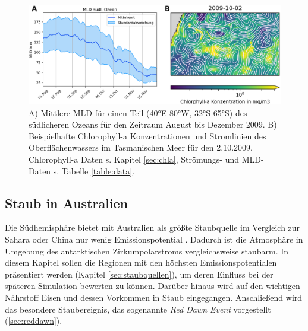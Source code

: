 \documentclass[12pt,a4paper,onecolumn]{scrartcl}
\begin{document}
\begin{figure}[!htb]
\includegraphics[width=\textwidth]{bilder/mld_currents.png}
\caption{A) Mittlere MLD für einen Teil (40°E-80°W, 32°S-65°S) des südlicheren Ozeans für den Zeitraum August bis Dezember 2009. B) Beispielhafte Chlorophyll-a Konzentrationen und Stromlinien des Oberflächenwassers im Tasmanischen Meer für den 2.10.2009. Chlorophyll-a Daten s. Kapitel \ref{sec:chla}, Strömungs- und MLD-Daten s. Tabelle \ref{table:data}.} \label{fig:mld_currents}
\end{figure}
\subsection{Staub in Australien} \label{sec:Staub}
Die Südhemisphäre bietet mit Australien als größte Staubquelle im Vergleich zur Sahara oder China nur wenig Emissionspotential \citep{Shao.2011}. Dadurch ist die Atmosphäre in Umgebung des antarktischen Zirkumpolarstroms vergleichsweise staubarm. In diesem Kapitel sollen die Regionen mit den höchsten Emissionspotentialen präsentiert werden (Kapitel \ref{sec:staubquellen}), um deren Einfluss bei der späteren Simulation bewerten zu können. Darüber hinaus wird auf den wichtigen Nährstoff Eisen und dessen Vorkommen in Staub eingegangen. Anschließend wird das besondere Staubereignis, das sogenannte \textit{Red Dawn Event} vorgestellt (\ref{sec:reddawn}).
\end{document}
